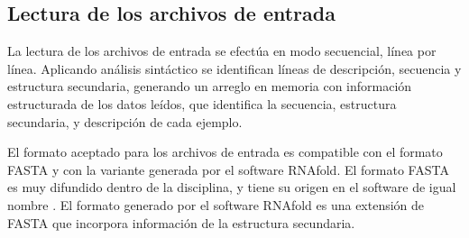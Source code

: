 %
%
\subsection{Lectura de los archivos de entrada}
%
La lectura de los archivos de entrada se efectúa en modo secuencial,
línea por línea.
Aplicando análisis sintáctico se identifican líneas de descripción,
secuencia y estructura secundaria, generando un arreglo en memoria con
información estructurada de los datos leídos, que identifica la
secuencia, estructura secundaria, y descripción de cada ejemplo.

El formato aceptado para los archivos de entrada es compatible con el
formato FASTA y con la variante generada por el software RNAfold.
El formato FASTA es muy difundido dentro de la disciplina, y tiene su
origen en el software de igual nombre \cite{fasta}.
El formato generado por el software RNAfold \cite{vienna} es una
extensión de FASTA que incorpora información de la estructura
secundaria.
